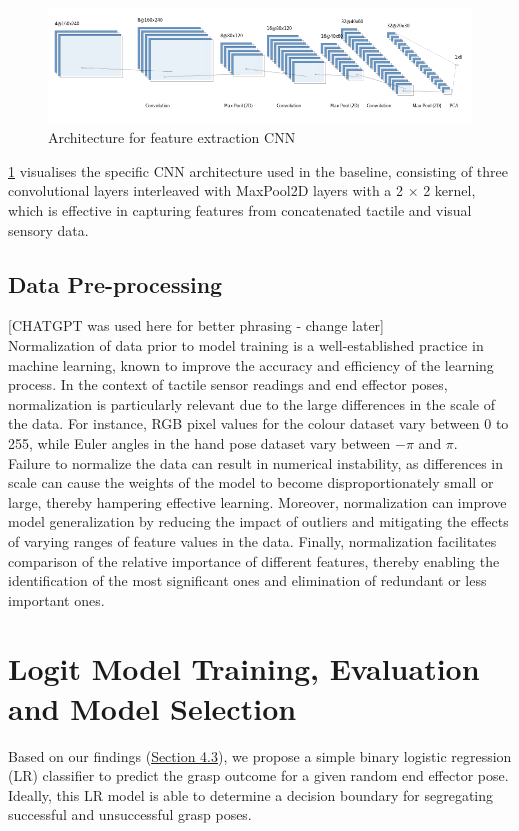 \documentclass[11pt, a4paper]{report}
\begin{document}
\begin{figure}[H]
    \includegraphics[scale=0.7]{docs/Project Report/Media/nn.png}
    \caption{Architecture for feature extraction CNN}
    \label{fig:4.5}
\end{figure}

\ref{fig:4.5} visualises the specific CNN architecture used in the baseline, consisting of three convolutional layers interleaved with MaxPool2D layers with a 2 × 2 kernel, which is effective in capturing features from concatenated tactile and visual sensory data. 


\subsection{Data Pre-processing}
\label{sec:4.4.3}
{\color{red} [CHATGPT was used here for better phrasing - change later]}\\
Normalization of data prior to model training is a well-established practice in machine learning, known to improve the accuracy and efficiency of the learning process. In the context of tactile sensor readings and end effector poses, normalization is particularly relevant due to the large differences in the scale of the data. For instance, RGB pixel values for the colour dataset vary between 0 to 255, while Euler angles in the hand pose dataset vary between $-\pi$ and $\pi$.\\

Failure to normalize the data can result in numerical instability, as differences in scale can cause the weights of the model to become disproportionately small or large, thereby hampering effective learning. Moreover, normalization can improve model generalization by reducing the impact of outliers and mitigating the effects of varying ranges of feature values in the data. Finally, normalization facilitates comparison of the relative importance of different features, thereby enabling the identification of the most significant ones and elimination of redundant or less important ones.


\section{Logit Model Training, Evaluation and Model Selection}
\label{sec:4.5}
Based on our findings (\hyperref[sec:4.3]{Section 4.3}), we propose a simple binary logistic regression (LR) classifier to predict the grasp outcome for a given random end effector pose. Ideally, this LR model is able to determine a decision boundary for segregating successful and unsuccessful grasp poses.\\
\end{document}
